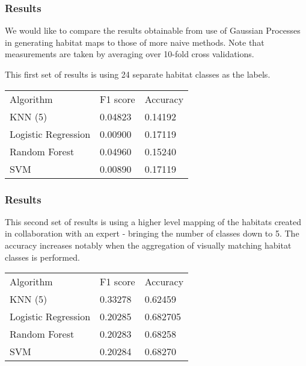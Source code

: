 \documentclass{beamer}
\begin{document}
\begin{frame}
    \frametitle{Results}
    We would like to compare the results obtainable from use of Gaussian Processes in generating habitat maps to those of more naive methods. Note that measurements are taken by averaging over 10-fold cross validations.

    This first set of results is using 24 separate habitat classes as the labels.

    \begin{tabular}{l | l | l}
        Algorithm & F1 score & Accuracy \\
        KNN (5) & 0.04823 &  0.14192 \\
        Logistic Regression & 0.00900 & 0.17119 \\
        Random Forest & 0.04960 &  0.15240 \\
        SVM & 0.00890 & 0.17119 \\
    \end{tabular}

\end{frame}

\begin{frame}
    \frametitle{Results}
    This second set of results is using a higher level mapping of the habitats created in collaboration with an expert - bringing the number of classes down to 5. The accuracy increases notably when the aggregation of visually matching habitat classes is performed.

    \begin{tabular}{l | l | l}
        Algorithm & F1 score & Accuracy \\
        KNN (5) & 0.33278 & 0.62459 \\
        Logistic Regression & 0.20285 & 0.682705 \\
        Random Forest & 0.20283 & 0.68258 \\
        SVM & 0.20284 & 0.68270 \\
    \end{tabular}

\end{frame}
\end{document}
